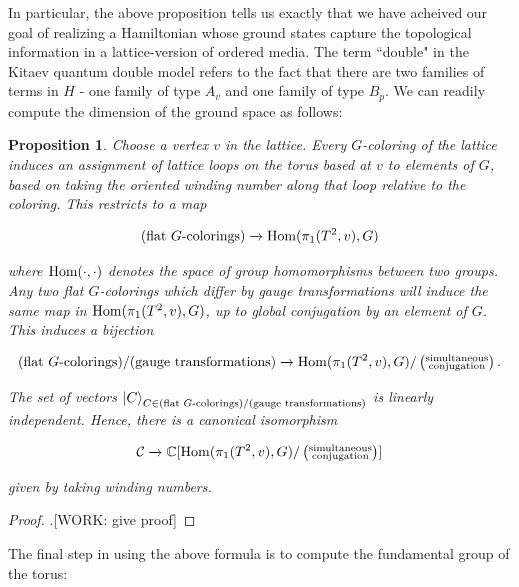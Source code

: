 \documentclass{article}
\newtheorem{proposition}{Proposition}[section]
\theoremstyle{definition}
\numberwithin{figure}{section}
\begin{document}
In particular, the above proposition tells us exactly that we have acheived our goal of realizing a Hamiltonian whose ground states capture the topological information in a lattice-version of ordered media.  The term ``double" in the Kitaev quantum double model refers to the fact that there are two families of terms in $H$ - one family of type $A_v$ and one family of type $B_p$. We can readily compute the dimension of the ground space as follows:

\begin{proposition} Choose a vertex $v$ in the lattice. Every $G$-coloring of the lattice induces an assignment of lattice loops on the torus based at $v$ to elements of $G$, based on taking the oriented winding number along that loop relative to the coloring. This restricts to a map

$$(\text{flat $G$-colorings})\xrightarrow{}\mathrm{Hom}(\pi_1(T^2,v), G)$$

where $\mathrm{Hom}(\cdot,\cdot)$ denotes the space of group homomorphisms between two groups. Any two flat $G$-colorings which differ by gauge transformations will induce the same map in $\mathrm{Hom}(\pi_1(T^2,v), G)$, up to global conjugation by an element of $G$. This induces a bijection

$$(\text{flat $G$-colorings})/(\text{gauge transformations})\xrightarrow{}\mathrm{Hom}(\pi_1(T^2,v), G)/\left(\substack{\text{simultaneous} \\ \text{conjugation}}\right).$$

The set of vectors ${\ket{C}}_{C\in (\text{flat $G$-colorings})/(\text{gauge transformations})}$ is linearly independent. Hence, there is a canonical isomorphism

$$\mathcal{C} \xrightarrow{}\mathbb{C}[\mathrm{Hom}(\pi_1(T^2,v), G)/\left(\substack{\text{simultaneous} \\ \text{conjugation}}\right)]$$

given by taking winding numbers.
\end{proposition}
\begin{proof}.[WORK: give proof]
\end{proof}

The final step in using the above formula is to compute the fundamental group of the torus:
\end{document}
